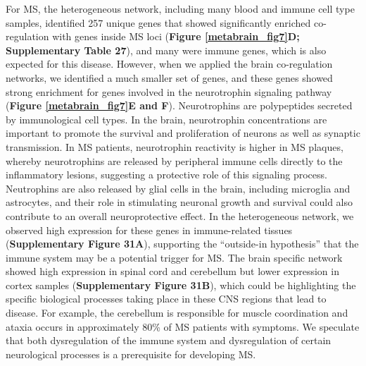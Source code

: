 For MS, the heterogeneous network, including many blood and immune cell type samples, identified 257 unique genes that showed significantly enriched co-regulation with genes inside MS loci (\textbf{Figure \ref{metabrain_fig7}D; Supplementary Table 27}), and many were immune genes, which is also expected for this disease. However, when we applied the brain co-regulation networks, we identified a much smaller set of genes, and these genes showed strong enrichment for genes involved in the neurotrophin signaling pathway (\textbf{Figure \ref{metabrain_fig7}E and F}). Neurotrophins are polypeptides secreted by immunological cell types. In the brain, neurotrophin concentrations are important to promote the survival and proliferation of neurons as well as synaptic transmission. In MS patients, neurotrophin reactivity is higher in MS plaques, whereby neurotrophins are released by peripheral immune cells directly to the inflammatory lesions, suggesting a protective role of this signaling process\cite{kalinowskalyszczarzRoleNeurotrophinsMultiple2012,kerschensteinerActivatedHumanCells1999}. Neutrophins are also released by glial cells in the brain, including microglia and astrocytes, and their role in stimulating neuronal growth and survival could also contribute to an overall neuroprotective effect\cite{desantiNeuroinflammationNeuroprotectionUpdate2011}. In the heterogeneous network, we observed high expression for these genes in immune-related tissues (\textbf{Supplementary Figure 31A}), supporting the “outside-in hypothesis” that the immune system may be a potential trigger for MS\cite{consortiumMultipleSclerosisGenomic2019,baecherallanMultipleSclerosisMechanisms2018}. The brain specific network showed high expression in spinal cord and cerebellum but lower expression in cortex samples (\textbf{Supplementary Figure 31B}), which could be highlighting the specific biological processes taking place in these CNS regions that lead to disease. For example, the cerebellum is responsible for muscle coordination and ataxia occurs in approximately 80\% of MS patients with symptoms\cite{redondoPurkinjeCellPathology2015}. We speculate that both dysregulation of the immune system and dysregulation of certain neurological processes is a prerequisite for developing MS. 

